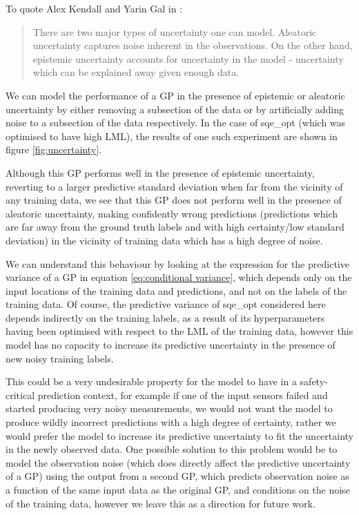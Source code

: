 To quote Alex Kendall and Yarin Gal in \cite{kendall2017uncertainties}:

\begin{quote}
    There are two major types of uncertainty one can model. Aleatoric uncertainty captures noise inherent in the observations. On the other hand, epistemic uncertainty accounts for uncertainty in the model - uncertainty which can be explained away given enough data.
\end{quote}

We can model the performance of a GP in the presence of epistemic or aleatoric uncertainty by either removing a subsection of the data or by artificially adding noise to a subsection of the data respectively. In the case of sqe\_opt (which was optimised to have high LML), the results of one such experiment are shown in figure \ref{fig:uncertainty}.

Although this GP performs well in the presence of epistemic uncertainty, reverting to a larger predictive standard deviation when far from the vicinity of any training data, we see that this GP does not perform well in the presence of aleatoric uncertainty, making confidently wrong predictions (predictions which are far away from the ground truth labels and with high certainty/low standard deviation) in the vicinity of training data which has a high degree of noise.

We can understand this behaviour by looking at the expression for the predictive variance of a GP in equation \ref{eq:conditional variance}, which depends only on the input locations of the training data and predictions, and not on the labels of the training data. Of course, the predictive variance of sqe\_opt considered here depends indirectly on the training labels, as a result of its hyperparameters having been optimised with respect to the LML of the training data, however this model has no capacity to increase its predictive uncertainty in the presence of new noisy training labels.

This could be a very undesirable property for the model to have in a safety-critical prediction context, for example if one of the input sensors failed and started producing very noisy measurements, we would not want the model to produce wildly incorrect predictions with a high degree of certainty, rather we would prefer the model to increase its predictive uncertainty to fit the uncertainty in the newly observed data. One possible solution to this problem would be to model the observation noise (which does directly affect the predictive uncertainty of a GP) using the output from a second GP, which predicts observation noise as a function of the same input data as the original GP, and conditions on the noise of the training data, however we leave this as a direction for future work.
